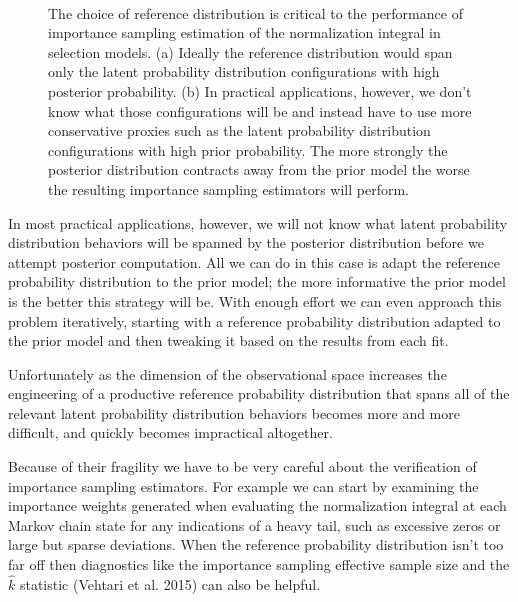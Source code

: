\documentclass[
  letterpaper,
  DIV=11,
  numbers=noendperiod]{scrartcl}
\begin{document}
\begin{figure}
\begin{minipage}{0.45\linewidth}
{}

\subcaption{\label{fig-realistic-importance}}

\end{minipage}%
%
\begin{minipage}{0.05\linewidth}
~\end{minipage}%

\caption{\label{fig-importance-reference}The choice of reference
distribution is critical to the performance of importance sampling
estimation of the normalization integral in selection models. (a)
Ideally the reference distribution would span only the latent
probability distribution configurations with high posterior probability.
(b) In practical applications, however, we don't know what those
configurations will be and instead have to use more conservative proxies
such as the latent probability distribution configurations with high
prior probability. The more strongly the posterior distribution
contracts away from the prior model the worse the resulting importance
sampling estimators will perform.}

\end{figure}%

In most practical applications, however, we will not know what latent
probability distribution behaviors will be spanned by the posterior
distribution before we attempt posterior computation. All we can do in
this case is adapt the reference probability distribution to the prior
model; the more informative the prior model is the better this strategy
will be. With enough effort we can even approach this problem
iteratively, starting with a reference probability distribution adapted
to the prior model and then tweaking it based on the results from each
fit.

Unfortunately as the dimension of the observational space increases the
engineering of a productive reference probability distribution that
spans all of the relevant latent probability distribution behaviors
becomes more and more difficult, and quickly becomes impractical
altogether.

Because of their fragility we have to be very careful about the
verification of importance sampling estimators. For example we can start
by examining the importance weights generated when evaluating the
normalization integral at each Markov chain state for any indications of
a heavy tail, such as excessive zeros or large but sparse deviations.
When the reference probability distribution isn't too far off then
diagnostics like the importance sampling effective sample size and the
\(\hat{k}\) statistic (Vehtari et al. 2015) can also be helpful.
\end{document}
